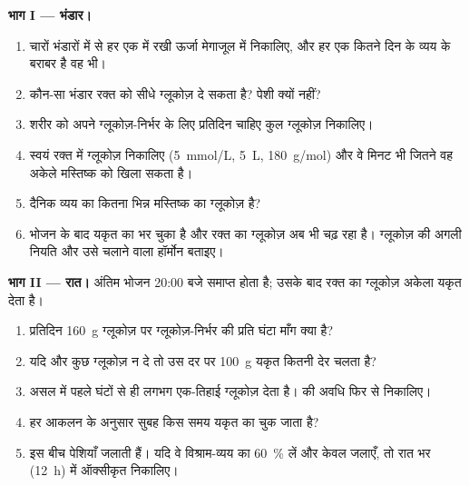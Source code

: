 \begin{problem}
\medskip
\noindent\textbf{भाग I --- भंडार।}
\begin{enumerate}
  \item चारों भंडारों में से हर एक में रखी ऊर्जा मेगाजूल में निकालिए,
        और हर एक कितने दिन के व्यय के बराबर है वह भी।
  \item कौन-सा भंडार रक्त को सीधे ग्लूकोज़ दे सकता है? पेशी 
        क्यों नहीं?
  \item शरीर को अपने ग्लूकोज़-निर्भर  के लिए प्रतिदिन चाहिए कुल
        ग्लूकोज़ निकालिए।
  \item स्वयं रक्त में ग्लूकोज़ निकालिए (\qty{5}{mmol/L},
        \qty{5}{L}, \qty{180}{g/mol}) और वे मिनट भी जितने वह अकेले
        मस्तिष्क को खिला सकता है।
  \item दैनिक व्यय का कितना भिन्न मस्तिष्क का ग्लूकोज़ है?
  \item भोजन के बाद यकृत का  भर चुका है और रक्त का ग्लूकोज़ अब
        भी चढ़ रहा है। ग्लूकोज़ की अगली नियति और उसे चलाने वाला हॉर्मोन
        बताइए।
\end{enumerate}

\medskip
\noindent\textbf{भाग II --- रात।}
अंतिम भोजन 20:00 बजे समाप्त होता है; उसके बाद रक्त का ग्लूकोज़ अकेला यकृत
देता है।
\begin{enumerate}[resume]
  \item प्रतिदिन \qty{160}{g} ग्लूकोज़ पर ग्लूकोज़-निर्भर  की
        प्रति घंटा माँग क्या है?
  \item यदि और कुछ ग्लूकोज़ न दे तो उस दर पर \qty{100}{g} यकृत
         कितनी देर चलता है?
  \item असल में  पहले घंटों से ही लगभग एक-तिहाई ग्लूकोज़ देता
        है।  की अवधि फिर से निकालिए।
  \item हर आकलन के अनुसार सुबह किस समय यकृत का  चुक जाता है?
  \item इस बीच पेशियाँ  जलाती हैं। यदि वे विश्राम-व्यय का
        \qty{60}{\%} लें और केवल  जलाएँ, तो रात भर (\qty{12}{h}) में
        ऑक्सीकृत  निकालिए।
\end{enumerate}


\end{problem}
